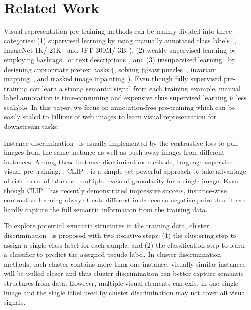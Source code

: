 \section{Related Work}

Visual representation pre-training methods can be mainly divided into three categories: (1) supervised learning by using manually annotated class labels (\eg, ImageNet-1K/-21K~\cite{deng2009imagenet} and JFT-300M/-3B~\cite{dosovitskiy2021image,zhai2022scaling}), (2) weakly-supervised learning by employing hashtags~\cite{mahajan2018exploring,singh2022revisiting} or text descriptions~\cite{radford2021learning,jia2021scaling,li2023scaling}, and (3) unsupervised learning~\cite{chen2020big,he2020momentum,caron2018deep} by 
designing appropriate pretext tasks (\eg, solving jigsaw puzzles~\cite{noroozi2016unsupervised}, invariant mapping~\cite{chen2021exploring}, and masked image inpainting~\cite{he2022masked}). Even though fully supervised pre-training can learn a strong semantic signal from each training example, manual label annotation is time-consuming and expensive thus supervised learning is less scalable. In this paper, we focus on annotation-free pre-training which can be easily scaled to billions of web images to learn visual representation for downstream tasks. 

Instance discrimination~\cite{chen2020big,he2020momentum,radford2021learning} is usually implemented by the contrastive loss to pull images from the same instance as well as push away images from different instances. Among these instance discrimination methods,  
language-supervised visual pre-training, \eg, CLIP~\cite{radford2021learning,yang2023alip,gu2024rwkv},
is a simple yet powerful approach to take advantage of rich forms of labels at multiple levels of granularity for a single image. Even though CLIP~\cite{radford2021learning} has recently demonstrated impressive success, instance-wise contrastive learning always treats different instances as negative pairs thus it can hardly capture the full semantic information from the training data. 

To explore potential semantic structures in the training data, cluster discrimination~\cite{caron2018deep,asano2019self,zhan2020online,li2020prototypical,caron2020unsupervised,qian2022unsupervised} is proposed with two iterative steps: (1) the clustering step to assign a single class label for each sample, and (2) the classification step to learn a classifier to predict the assigned pseudo label. In cluster discrimination methods, each cluster contains more than one instance, visually similar instances will be pulled closer and thus cluster discrimination can better capture semantic structures from data. However, multiple visual elements can exist in one single image and the single label used by cluster discrimination may not cover all visual signals. 

